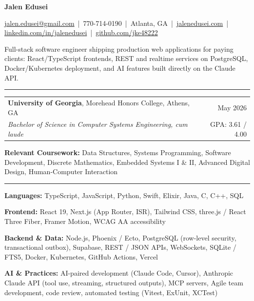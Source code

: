 \documentclass[letterpaper,10pt]{article}
\newcommand{\sectiontitle}[1]{\vspace{4pt}{\textbf{\large #1}}\par\vspace{-6pt}\rule{\textwidth}{0.4pt}\par\vspace{1pt}}
\begin{document}
\begin{center}
{\LARGE \textbf{Jalen Edusei}}\par
\vspace{2pt}
{\small \href{mailto:jalen.edusei@gmail.com}{jalen.edusei@gmail.com} \,|\,
770-714-0190 \,|\,
Atlanta, GA \,|\,
\href{https://www.jalenedusei.com}{jalenedusei.com} \,|\,
\href{https://www.linkedin.com/in/jalenedusei}{linkedin.com/in/jalenedusei} \,|\,
\href{https://github.com/jke48222}{github.com/jke48222}}
\end{center}

\vspace{3pt}
{\small Full-stack software engineer shipping production web applications for paying clients: React/TypeScript frontends, REST and realtime services on PostgreSQL, Docker/Kubernetes deployment, and AI features built directly on the Claude API.}\par

\sectiontitle{EDUCATION}
\begin{tabularx}{\textwidth}{@{}X r@{}}
\textbf{University of Georgia}, Morehead Honors College, Athens, GA & May 2026 \\
\textit{Bachelor of Science in Computer Systems Engineering, cum laude} & GPA: 3.61 / 4.00 \\
\end{tabularx}
\vspace{1pt}\par
{\small \textbf{Relevant Coursework:} Data Structures, Systems Programming, Software Development, Discrete Mathematics, Embedded Systems I \& II, Advanced Digital Design, Human-Computer Interaction}

\sectiontitle{TECHNICAL SKILLS}
\textbf{Languages:} TypeScript, JavaScript, Python, Swift, Elixir, Java, C, C++, SQL\par
\textbf{Frontend:} React 19, Next.js (App Router, ISR), Tailwind CSS, three.js / React Three Fiber, Framer Motion, WCAG AA accessibility\par
\textbf{Backend \& Data:} Node.js, Phoenix / Ecto, PostgreSQL (row-level security, transactional outbox), Supabase, REST / JSON APIs, WebSockets, SQLite / FTS5, Docker, Kubernetes, GitHub Actions, Vercel\par
\textbf{AI \& Practices:} AI-paired development (Claude Code, Cursor), Anthropic Claude API (tool use, streaming, structured outputs), MCP servers, Agile team development, code review, automated testing (Vitest, ExUnit, XCTest)
\end{document}
